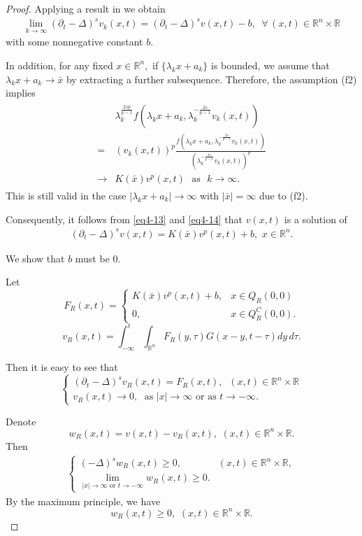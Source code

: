\documentclass[12pt]{article}
\theoremstyle{remark}
\numberwithin{equation}{section}
\newcommand{\R}{\mathbb{R}}
\begin{document}
\begin{proof}
Applying a result in \cite{CGL} we obtain
\begin{eqnarray}\label{eq4-13}
\lim_{k \to \infty} (\partial_t -\Delta)^s v_k(x,t)= (\partial_t-\Delta)^s v(x,t)-b, \;\; \forall \, (x,t) \in \mathbb{R}^n \times \R
\end{eqnarray}
with some nonnegative constant $b$.

In addition, for any fixed $x\in \mathbb{R}^n,$ if $\{\lambda_k x+a_k\}$ is bounded, we assume that $\lambda_k x+a_k \to \bar x$  by extracting a further
subsequence. Therefore, the assumption (f2) implies
\begin{eqnarray}\label{eq4-14}
\begin{aligned}
&\lambda_k^{\frac{2sp}{p-1}} f(\lambda_k x+a_k, \lambda_k^{-\frac{2s}{p-1}} v_k(x,t))\\
= & (v_k(x,t))^p\frac{f(\lambda_k x+a_k, \lambda_k^{-\frac{2s}{p-1}} v_k(x,t))}{\left(\lambda_k^{-\frac{2s}{p-1}} v_k(x,t)\right)^p}\\
\to& K(\bar x) v^p(x,t)\,\, \mbox{ as }\,\, k\to \infty.
\end{aligned}
\end{eqnarray}
This is  still valid in the case $|\lambda_k x+a_k| \to \infty$ with $|\bar x|= \infty$ due to (f2).

Consequently,  it follows from \eqref{eq4-13} and \eqref{eq4-14} that $v(x,t)$ is a solution of
\begin{eqnarray}\label{eq4-15}
(\partial_t-\Delta)^s v(x,t)=K(\bar x) v^p(x,t) + b,\,\, x\in \mathbb{R}^n.
\end{eqnarray}

We show that $b$ must be $0.$


Let $$F_R(x,t) = \left\{\begin{array}{ll} K(\bar{x})v^p(x,t) + b, & x \in Q_R(0,0)\\
0, & x \in Q_R^C(0,0).
\end{array}
\right.
$$
$$
v_R(x,t)=\int_{-\infty}^t \int_{\mathbb{R}^n} F_R(y,\tau) G(x-y, t-\tau) dy \, d \tau.
$$

Then it is easy to see that
$$
\left\{\begin{array}{ll} (\partial_t-\Delta)^s v_R(x,t)= F_R(x,t), \;\;  (x,t) \in \mathbb{R}^n \times \R\\
 v_R(x,t) \to 0, \; \mbox{ as } |x| \to \infty \mbox{ or as } t \to -\infty.
\end{array}
\right.
$$

Denote
$$
w_R(x,t)=v(x,t)-v_R(x,t), \,\, (x,t) \in \mathbb{R}^n \times \R.
$$
Then
\begin{eqnarray*}
\begin{cases}
(-\Delta)^s w_R(x,t)\geq 0,& (x,t) \in \mathbb{R}^n \times \R,\\
\lim_{|x| \to \infty \mbox{ or } t \to -\infty}  w_R(x,t) \geq 0.
\end{cases}
\end{eqnarray*}
By the maximum principle, we have
$$
w_R(x,t) \geq 0,\,\, (x,t) \in \mathbb{R}^n \times \R.
$$


\end{proof}
\end{document}
